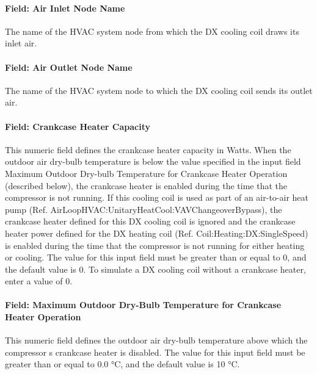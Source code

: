 \paragraph{Field: Air Inlet Node Name}\label{field-air-inlet-node-name-10}

The name of the HVAC system node from which the DX cooling coil draws its inlet air.

\paragraph{Field: Air Outlet Node Name}\label{field-air-outlet-node-name-10}

The name of the HVAC system node to which the DX cooling coil sends its outlet air.

\paragraph{Field: Crankcase Heater Capacity}\label{field-crankcase-heater-capacity-1}

This numeric field defines the crankcase heater capacity in Watts. When the outdoor air dry-bulb temperature is below the value specified in the input field Maximum Outdoor Dry-bulb Temperature for Crankcase Heater Operation (described below), the crankcase heater is enabled during the time that the compressor is not running. If this cooling coil is used as part of an air-to-air heat pump (Ref. AirLoopHVAC:UnitaryHeatCool:VAVChangeoverBypass), the crankcase heater defined for this DX cooling coil is ignored and the crankcase heater power defined for the DX heating coil (Ref. Coil:Heating:DX:SingleSpeed) is enabled during the time that the compressor is not running for either heating or cooling. The value for this input field must be greater than or equal to 0, and the default value is 0. To simulate a DX cooling coil without a crankcase heater, enter a value of 0.

\paragraph{Field: Maximum Outdoor Dry-Bulb Temperature for Crankcase Heater Operation}\label{field-maximum-outdoor-dry-bulb-temperature-for-crankcase-heater-operation-1}

This numeric field defines the outdoor air dry-bulb temperature above which the compressor s crankcase heater is disabled. The value for this input field must be greater than or equal to 0.0 °C, and the default value is 10 °C.

